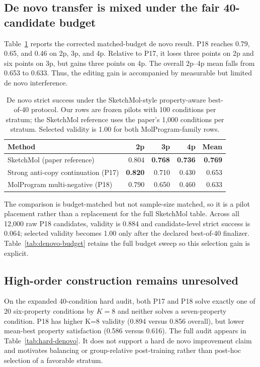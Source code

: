 \subsection{De novo transfer is mixed under the fair 40-candidate budget}
Table~\ref{tab:denovo-2p4p} reports the corrected matched-budget de novo
result. P18 reaches 0.79, 0.65, and 0.46 on 2p, 3p, and 4p. Relative to P17,
it loses three points on 2p and six points on 3p, but gains three points on 4p.
The overall 2p--4p mean falls from 0.653 to 0.633. Thus, the editing gain is
accompanied by measurable but limited de novo interference.

\begin{table}[t]
  \centering
  \caption{De novo strict success under the SketchMol-style property-aware
  best-of-40 protocol. Our rows are frozen pilots with 100 conditions per
  stratum; the SketchMol reference uses the paper's 1,000 conditions per
  stratum. Selected validity is 1.00 for both MolProgram-family rows.}
  \label{tab:denovo-2p4p}
  \small
  \setlength{\tabcolsep}{5pt}
  \begin{tabular}{lrrrr}
    \toprule
    Method & 2p & 3p & 4p & Mean \\
    \midrule
    SketchMol (paper reference) & 0.804 & \textbf{0.768} & \textbf{0.736} & \textbf{0.769} \\
    Strong anti-copy continuation (P17) & \textbf{0.820} & 0.710 & 0.430 & 0.653 \\
    MolProgram multi-negative (P18) & 0.790 & 0.650 & 0.460 & 0.633 \\
    \bottomrule
  \end{tabular}
\end{table}

The comparison is budget-matched but not sample-size matched, so it is a pilot
placement rather than a replacement for the full SketchMol table. Across all
12,000 raw P18 candidates, validity is 0.884 and candidate-level strict
success is 0.064; selected validity becomes 1.00 only after the declared
best-of-40 finalizer. Table~\ref{tab:denovo-budget} retains the full budget
sweep so this selection gain is explicit.

\subsection{High-order construction remains unresolved}
On the expanded 40-condition hard audit, both P17 and P18 solve exactly one of
20 six-property conditions by $K=8$ and neither solves a seven-property
condition. P18 has higher K=8 validity (0.894 versus 0.856 overall), but lower
mean-best property satisfaction (0.586 versus 0.616). The full audit appears
in Table~\ref{tab:hard-denovo}. It does not support a hard de novo improvement
claim and motivates balancing or group-relative post-training rather than
post-hoc selection of a favorable stratum.

